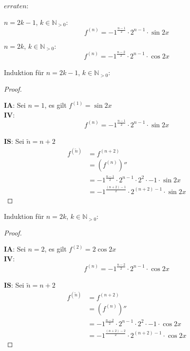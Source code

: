 \begin{enumerate}
$erraten$:

$n=2k-1$, $k\in\mathbb{N}_{>0}$:
\begin{equation}
f^{(n)}=-1^{\frac{n-1}{2}}\cdot 2^{n-1}\cdot\sin 2x
\end{equation}

$n=2k$, $k\in\mathbb{N}_{>0}$:
\begin{equation}
f^{(n)}=-1^{\frac{n-2}{2}}\cdot 2^{n-1}\cdot\cos 2x
\end{equation}\\

Induktion für $n=2k-1$, $k\in\mathbb{N}_{>0}$:
\begin{proof}
$ $\newline

$\mathbf{IA}$: Sei $n=1$, es gilt $f^{(1)}=\sin 2x$\\

$\mathbf{IV}$:
\begin{equation}
f^{(n)}=-1^{\frac{n-1}{2}}\cdot 2^{n-1}\cdot\sin 2x
\end{equation}\\

$\mathbf{IS}$: Sei $\tilde{n}=n+2$
\begin{align}
f^{(\tilde{n})}&=f^{(n+2)}\\
&=(f^{(n)})''\\
&=-1^{\frac{n-1}{2}}\cdot 2^{n-1}\cdot 2^2\cdot -1\cdot \sin 2x\\
&=-1^{\frac{(n+2)-1}{2}}\cdot 2^{(n+2)-1}\cdot \sin 2x
\end{align}
\end{proof}

Induktion für $n=2k$, $k\in\mathbb{N}_{>0}$:
\begin{proof}
$ $\newline

$\mathbf{IA}$: Sei $n=2$, es gilt $f^{(2)}=2\cos 2x$\\

$\mathbf{IV}$:
\begin{equation}
f^{(n)}=-1^{\frac{n-2}{2}}\cdot 2^{n-1}\cdot\cos 2x
\end{equation}\\

$\mathbf{IS}$: Sei $\tilde{n}=n+2$
\begin{align}
f^{(\tilde{n})}&=f^{(n+2)}\\
&=(f^{(n)})''\\
&=-1^{\frac{n-2}{2}}\cdot 2^{n-1}\cdot 2^2\cdot -1\cdot \cos 2x\\
&=-1^{\frac{(n+2)-2}{2}}\cdot 2^{(n+2)-1}\cdot \cos 2x
\end{align}
\end{proof}


\end{enumerate}
